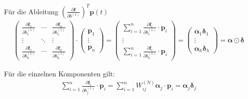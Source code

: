 \documentclass[a4paper, 12pt]{scrartcl}
\begin{document}
Für die Ableitung $\left(\frac{\partial \bm{f}}{\partial b^{(1)}}\right)^T \bm{p}(t)$
\begin{align*}
    \begin{pmatrix}
        \frac{\partial \bm{f}_1}{\partial b^{(1)}_1} 
        &
        \cdots
        &
        \frac{\partial \bm{f}_n}{\partial b^{(1)}_1}
        \\
        \vdots
        &
        \ddots
        &
        \vdots
        \\
        \frac{\partial \bm{f}_1}{\partial b^{(1)}_h}
        &
        \cdots
        &
        \frac{\partial \bm{f}_n}{\partial b^{(1)}_h}
    \end{pmatrix}
    \cdot
    \begin{pmatrix}
        \bm{p}_1 
        \\
        \vdots
        \\
        \bm{p}_n
    \end{pmatrix}
    =
    \begin{pmatrix}
        \sum_{i=1}^{n} \frac{\partial \bm{f}_i}{\partial b^{(1)}_1} \cdot \bm{p}_i
        \\
        \vdots
        \\
        \sum_{i=1}^{n} \frac{\partial \bm{f}_i}{\partial b^{(1)}_h} \cdot \bm{p}_i
    \end{pmatrix}
    =
    \begin{pmatrix}
        \bm{\alpha}_1 \bm{\delta}_1 
        \\
        \vdots
        \\
        \bm{\alpha}_h \bm{\delta}_h
    \end{pmatrix}
    =
    \bm{\alpha} \odot \bm{\delta}
\end{align*}

Für die einzelnen Komponenten gilt: 
%
\begin{align*}
    \sum_{i=1}^{n} \frac{\partial \bm{f}_i}{\partial b^{(1)}_j} \cdot \bm{p}_i
    =
    \sum_{i=1}^{n} W^{(N)}_{ij} \bm{\alpha}_j \cdot \bm{p}_i
    =
    \bm{\alpha}_j \bm{\delta}_j
\end{align*}
\end{document}
